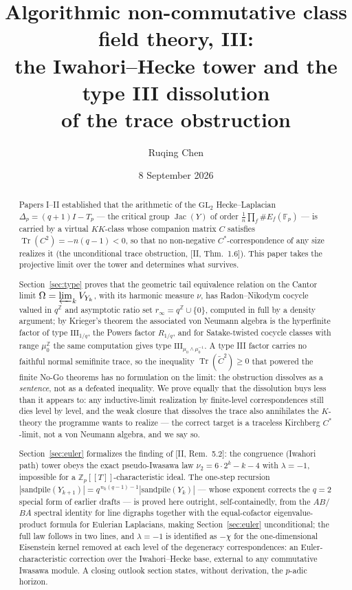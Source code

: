 \documentclass[11pt]{amsart}
\title[Algorithmic non-commutative class field theory, III]
{Algorithmic non-commutative class field theory, III:\\
the Iwahori--Hecke tower and the type III dissolution\\ of the trace obstruction}
\author{Ruqing Chen}
\date{8 September 2026}
\numberwithin{equation}{section}
\theoremstyle{definition}
\theoremstyle{remark}
\newcommand{\Z}{\mathbb{Z}}
\newcommand{\Tr}{\operatorname{Tr}}
\newcommand{\Jac}{\operatorname{Jac}}
\newcommand{\GL}{\mathrm{GL}}
\begin{document}
\begin{abstract}
Papers I--II established that the arithmetic of the $\GL_2$ Hecke--Laplacian
$\Delta_p=(q+1)I-T_p$ --- the critical group $\Jac(Y)$ of order
$\frac1n\prod_f\#E_f(\mathbb F_p)$ --- is carried by a virtual $KK$-class whose
companion matrix $C$ satisfies $\Tr(C^2)=-n(q-1)<0$, so that no non-negative
$C^*$-correspondence of any size realizes it (the unconditional trace obstruction,
[II, Thm.~1.6]). This paper takes the projective limit over the tower and determines
what survives.

Section~\ref{sec:type} proves that the geometric tail equivalence relation on the
Cantor limit $\Omega=\varprojlim_kV_{Y_k}$, with its harmonic measure $\nu$, has
Radon--Nikodym cocycle valued in $q^{\Z}$ and asymptotic ratio set
$r_\infty=q^{\Z}\cup\{0\}$, computed in full by a density argument; by
Krieger's theorem the associated von Neumann algebra is the hyperfinite factor of type
$\mathrm{III}_{1/q}$, the Powers factor $R_{1/q}$, and for Satake-twisted cocycle
classes with range $\mu_0^{\Z}$ the same computation gives type
$\mathrm{III}_{\mu_0\wedge\mu_0^{-1}}$. A type III factor carries no faithful normal
semifinite trace, so the inequality $\Tr(\widetilde C^2)\ge0$ that powered the finite
No-Go theorems has no formulation on the limit: the obstruction dissolves as a
\emph{sentence}, not as a defeated inequality. We prove equally that the dissolution
buys less than it appears to: any inductive-limit realization by finite-level
correspondences still dies level by level, and the weak closure that dissolves the
trace also annihilates the $K$-theory the programme wants to realize --- the correct
target is a traceless Kirchberg $C^*$-limit, not a von Neumann algebra, and we say so.

Section~\ref{sec:euler} formalizes the finding of [II, Rem.~5.2]: the congruence
(Iwahori path) tower obeys the exact pseudo-Iwasawa law $\nu_2=6\cdot2^k-k-4$ with
$\lambda=-1$, impossible for a $\Z_p[[T]]$-characteristic ideal. The one-step
recursion $|\mathrm{sandpile}(Y_{k+1})|=q^{\,n_k(q-1)-1}|\mathrm{sandpile}(Y_k)|$ ---
whose exponent corrects the $q=2$ special form of earlier drafts --- is proved here
outright, self-containedly, from the $AB$/$BA$ spectral identity for line digraphs
together with the equal-cofactor eigenvalue-product formula for Eulerian Laplacians,
making Section~\ref{sec:euler} unconditional; the full law follows in two lines, and
$\lambda=-1$ is identified as $-\chi$ for the one-dimensional Eisenstein kernel removed
at each level of the degeneracy correspondences: an Euler-characteristic correction
over the Iwahori--Hecke base, external to any commutative Iwasawa module. A closing
outlook section states, without derivation, the $p$-adic horizon.
\end{abstract}
\end{document}
